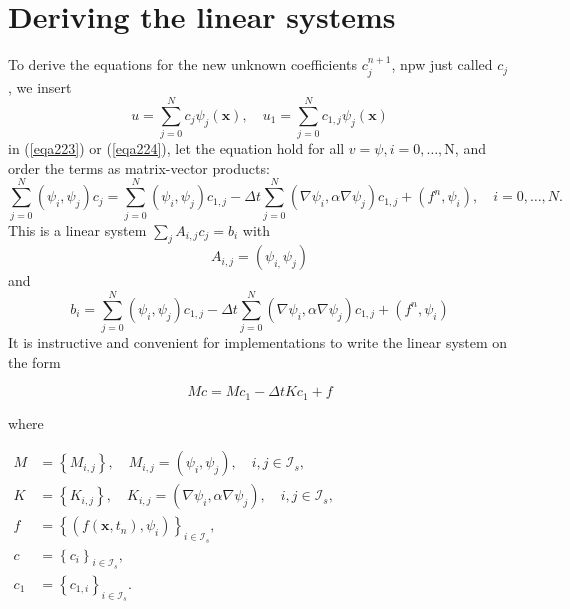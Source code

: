 \documentclass[../main.tex]{subfiles}
\begin{document}
	\section[Deriving the linear systems]{Deriving the linear systems}
		\label{sec:sec_19_4}
		\noindent To derive the equations for the new unknown coefficients $c_{j}^{n+1}$, npw just called $c_{j}$, we insert
		$$
		u=\sum_{j=0}^{N} c_{j} \psi_{j}(\boldsymbol{x}), \quad u_{1}=\sum_{j=0}^{N} c_{1, j} \psi_{j}(\boldsymbol{x})
		$$
		in (\ref{eqa223}) or (\ref{eqa224}), let the equation hold for all $v=\psi, i=0, \ldots, \mathrm{N}$, and order the terms as matrix-vector products:
	\begin{equation}
			\label{eqa225}	
		\sum_{j=0}^{N}\left(\psi_{i}, \psi_{j}\right) c_{j}=\sum_{j=0}^{N}\left(\psi_{i}, \psi_{j}\right) c_{1, j}-\Delta t \sum_{j=0}^{N}\left(\nabla \psi_{i}, \alpha \nabla \psi_{j}\right) c_{1, j}+\left(f^{n}, \psi_{i}\right), \quad i=0, \ldots, N .
	\end{equation}
		This is a linear system $\sum_{j} A_{i, j} c_{j}=b_{i}$ with
		$$
		A_{i, j}=\left(\psi_{i,} \psi_{j}\right)
		$$
		and
		$$
		b_{i}=\sum_{j=0}^{N}\left(\psi_{i}, \psi_{j}\right) c_{1, j}-\Delta t \sum_{j=0}^{N}\left(\nabla \psi_{i}, \alpha \nabla \psi_{j}\right) c_{1, j}+\left(f^{n}, \psi_{i}\right)
		$$\smallbreak
		It is instructive and convenient for implementations to write the linear system on the form

	\begin{equation}
		\label{eqa226}	
		M c=M c_{1}-\Delta t K c_{1}+f
	\end{equation}

		where\bigbreak
		
		$\begin{aligned}
			M &=\left\{M_{i, j}\right\}, \quad M_{i, j}=\left(\psi_{i}, \psi_{j}\right), \quad i, j \in \mathcal{I}_{s}, \\ K &=\left\{K_{i, j}\right\}, \quad K_{i, j}=\left(\nabla \psi_{i}, \alpha \nabla \psi_{j}\right), \quad i, j \in \mathcal{I}_{s}, \\ f &=\left\{\left(f\left(\boldsymbol{x}, t_{n}\right), \psi_{i}\right)\right\}_{i \in \mathcal{I}_{s}}, \\ c &=\left\{c_{i}\right\}_{i \in \mathcal{I}_{s}}, \\ c_{1} &=\left\{c_{1, i}\right\}_{i \in \mathcal{I}_{s}} .
		 \end{aligned}$
		
\end{document}
